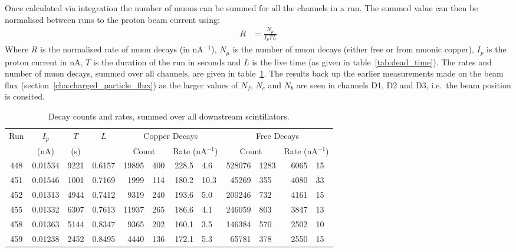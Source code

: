 \clearpage

Once calculated via integration the number of muons can be summed for all the channels in a run. The summed value can then be normalised between runs to the proton beam current using:
\begin{align}
  R &= \frac{N_{\mu}}{I_p T L} \label{equ:rate}
\end{align}
Where \( R \) is the normalised rate of muon decays (in nA\(^{-1}\)), \(N_{\mu}\) is the number of muon decays (either free or from muonic copper), \( I_p \) is the proton current in nA, \( T \) is the duration of the run in seconds and \(L\) is the live time (as given in table~\ref{tab:dead_time}). The rates and number of muon decays, summed over all channels, are given in table~\ref{tab:rates_res}. The results back up the earlier measurements made on the beam flux (section~\ref{cha:charged_particle_flux}) as the larger values of \(N_f\), \( N_c \) and \(N_b\) are seen in channels D1, D2 and D3, i.e.\ the beam position is consited.

\begin{table}
  \begin{center}
  \begin{tabular}{c | c | c | c | r@{\(\pm\)}l | r@{\(\pm\)}l | r@{\(\pm\)}l | r@{\(\pm\)}l  }
    \multirow{2}{*}{Run}  &  \(I_{p}\)  &  \(T\)  &  \multirow{2}{*}{\(L\)}  
         &  \multicolumn{4}{c|}{Copper Decays}   
                                          & \multicolumn{4}{c}{Free Decays}\\
                          &  (nA)       &   (s)   &
         &  \multicolumn{2}{c|}{Count}
                         &  \multicolumn{2}{c|}{ Rate (nA\(^{-1}\))}
                                          &  \multicolumn{2}{c|}{Count}
                                                            &  \multicolumn{2}{c}{Rate (nA\(^{-1}\))} \\
    \hline
    448  &  0.01534  &  9221  &  0.6157  &  19895 & 400  &  228.5 & 4.6   &  528076 & 1283  &  6065 & 15  \\
    451  &  0.01546  &  1001  &  0.7169  &   1999 & 114  &  180.2 & 10.3  &   45269 & 355   &  4080 & 33  \\
    452  &  0.01313  &  4944  &  0.7412  &   9319 & 240  &  193.6 & 5.0   &  200246 & 732   &  4161 & 15  \\
    455  &  0.01332  &  6307  &  0.7613  &  11937 & 265  &  186.6 & 4.1   &  246059 & 803   &  3847 & 13  \\
    458  &  0.01363  &  5144  &  0.8347  &   9365 & 202  &  160.1 & 3.5   &  146384 & 570   &  2502 & 10  \\
    459  &  0.01238  &  2452  &  0.8495  &   4440 & 136  &  172.1 & 5.3   &   65781 & 378   &  2550 & 15  \\
  \end{tabular}
  \end{center}
  \caption{Decay counts and rates, summed over all downstream scintillators.}
  \label{tab:rates_res}
\end{table}


